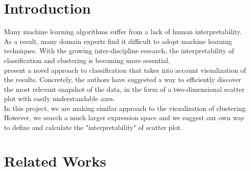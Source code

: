 \documentclass[fleqn]{SelfArx} %
\newlength{\tocsep}
\begin{document}
\flushbottom %

\maketitle %


\thispagestyle{empty} %


\section{Introduction} %


Many machine learning algorithms suffer from a lack of human interpretability. As a result, many domain experts find it difficult to adopt machine learning techniques. With the growing inter-discipline research, the interpretability of classification and clustering is becoming more essential.\\

\cite{av} present a novel approach to classification that takes into account visualization of the results. Concretely, the authors have suggested a way to efficiently discover the most relevant snapshot of the data, in the form of a two-dimensional scatter plot with easily understandable axes.\\

In this project, we are making similar approach to the visualization of clustering. However, we search a much larger expression space and we suggest our own way to define and calculate the "interpretability" of scatter plot.

\section{Related Works}
\end{document}
